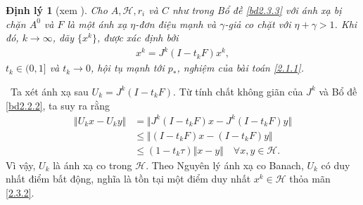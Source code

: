 \documentclass[14pt, oneside,A4paper]{book}
\theoremstyle{plain}
\newcommand{\chm}{{\bf  Chứng minh.}}
\newtheorem{dl}[theorem]{Định lý}
\begin{document}
\begin{dl}[xem \cite{BHN}] \label{dl2.3.5}
Cho $A,\mathcal H,r_{i}$ và $C$ như trong Bổ đề \ref{bd2.3.3} với ánh xạ bị chặn $A^{0}$ và $F$ là một ánh xạ $\eta$-đơn điệu mạnh và $\gamma$-giả co chặt với $\eta + \gamma > 1$. Khi đó, $k \rightarrow \infty$, dãy $\lbrace x^{k} \rbrace$, được xác định bởi
\begin{align} \label{2.3.2}
x^{k}=J^{k}(I-t_{k}F)x^{k},
\end{align}
$t_{k} \in (0,1]$ và $t_{k} \rightarrow 0$, hội tụ mạnh tới $p_{*}$, nghiệm của bài toán \eqref{2.1.1}.
\end{dl}
\noindent \chm \rm \ 
Ta xét ánh xạ sau $U_{k}=J^{k}(I-t_{k}F)$. Từ tính chất không giãn của $J^{k}$ và Bổ đề \ref{bd2.2.2}, ta suy ra rằng
\begin{align*}
\Vert U_{k}x-U_{k}y \Vert &= \Vert J^{k}(I-t_{k}F)x-J^{k}(I-t_{k}F)y \Vert \\
& \leq \Vert (I-t_{k}F)x-(I-t_{k}F)y \Vert \\
& \leq (1-t_{k}\tau)\Vert x-y \Vert \quad \forall x,y \in \mathcal H.
\end{align*}
Vì vậy, $U_{k}$ là ánh xạ co trong $\mathcal H$. Theo Nguyên lý ánh xạ co Banach, $U_{k}$ có duy nhất điểm bất động, nghĩa là tồn tại một điểm duy nhất $x^{k} \in \mathcal H$ thỏa mãn \eqref{2.3.2}. 
\end{document}

